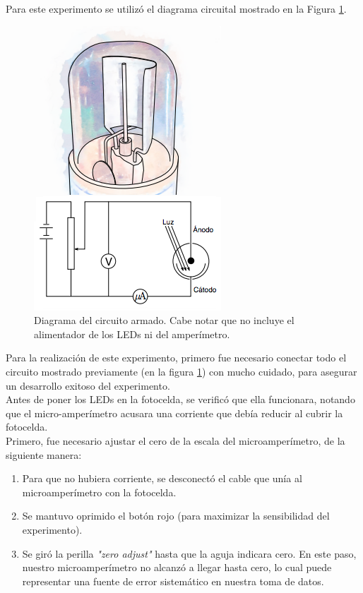\documentclass[%
 reprint,
 amsmath,amssymb,
 aps,
]{revtex4-1}
\begin{document}
Para este experimento se utilizó el diagrama circuital mostrado en la Figura \ref{fig:Figura 2}.
\begin{figure}[H]
    \centering
    \includegraphics[scale= 0.4]{Montaje.png}
    \caption{Diagrama del circuito armado. Cabe notar que no incluye el alimentador de los LEDs ni del amperímetro.}
    \label{fig:Figura 2}
\end{figure}
Para la realización de este experimento, primero fue necesario conectar todo el circuito mostrado previamente (en la figura \ref{fig:Figura 2}) con mucho cuidado, para asegurar un desarrollo exitoso del experimento. \\ 
Antes de poner los LEDs en la fotocelda, se verificó que ella funcionara, notando que el micro-amperímetro acusara una corriente que debía reducir al cubrir la fotocelda.\\
Primero, fue necesario ajustar el cero de la escala del microamperímetro, de la siguiente manera: 
\begin{enumerate}
    \item Para que no hubiera corriente, se desconectó el cable que unía al microamperímetro con la fotocelda. 
    \item Se mantuvo oprimido el botón rojo (para maximizar la sensibilidad del experimento).
    \item Se giró la perilla \textit{"zero adjust"} hasta que la aguja indicara cero. En este paso, nuestro microamperímetro no alcanzó a llegar hasta cero, lo cual puede representar una fuente de error sistemático en nuestra toma de datos.
\end{enumerate}
\end{document}

